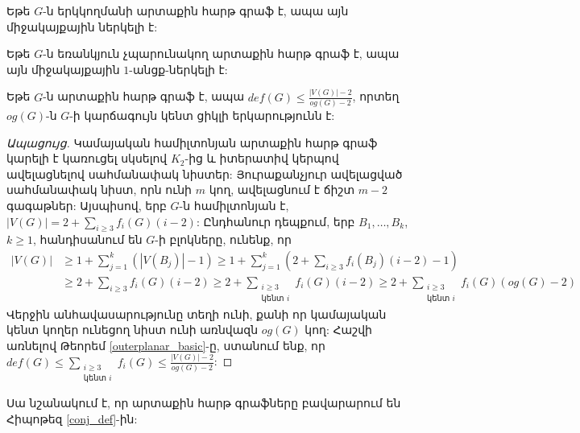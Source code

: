 \begin{hide}
\begin{corollary}
Եթե $G$-ն երկկողմանի արտաքին հարթ գրաֆ է, ապա այն միջակայքային ներկելի է:
\end{corollary}

\begin{corollary}
Եթե $G$-ն եռանկյուն չպարունակող արտաքին հարթ գրաֆ է, ապա այն միջակայքային $1$-անցք-ներկելի է:
\end{corollary}
\end{hide}

\begin{corollary}
Եթե $G$-ն արտաքին հարթ գրաֆ է, ապա 
$def(G) \leq \frac{|V(G)|-2}{og(G)-2}$,
որտեղ $og(G)$-ն $G$-ի կարճագույն կենտ ցիկլի երկարությունն է:
\end{corollary}
\begin{proof}[Ապացույց]
Կամայական համիլտոնյան արտաքին հարթ գրաֆ կարելի է կառուցել սկսելով $K_2$-ից և իտերատիվ կերպով ավելացնելով սահմանափակ նիստեր: Յուրաքանչյուր ավելացված սահմանափակ նիստ, որն ունի $m$ կող, ավելացնում է ճիշտ $m-2$ գագաթներ: Այսպիսով, երբ $G$-ն համիլտոնյան է, $|V(G)| = 2 + \sum\limits_{i\geq 3}f_i(G)(i-2)$: Ընդհանուր դեպքում, երբ $B_1, \ldots, B_k$, $k \geq 1$, հանդիսանում են $G$-ի բլոկները, ունենք, որ 
\begin{align*}
|V(G)| &\geq 1 + \sum\limits_{j=1}^{k}{\left(|V(B_j)|-1\right)} \geq 1 + \sum\limits_{j=1}^{k}{\left(2 + \sum\limits_{i\geq 3}f_i(B_j)(i-2) - 1\right)} \\
&\geq 2 + \sum\limits_{i\geq 3}f_i(G)(i-2) \geq 2 + \sum\limits_{\substack{i\geq 3\\\text{կենտ }i}}{f_i(G)(i-2)} \geq 2 + \sum\limits_{\substack{i\geq 3\\\text{կենտ }i}}{f_i(G)(og(G)-2)}
\end{align*}
Վերջին անհավասարությունը տեղի ունի, քանի որ կամայական կենտ կողեր ունեցող նիստ ունի առնվազն $og(G)$ կող: Հաշվի առնելով Թեորեմ \ref{outerplanar_basic}-ը, ստանում ենք, որ
$def(G) \leq \sum\limits_{\substack{i\geq 3\\\text{կենտ }i}}{f_i(G)} \leq \frac{|V(G)| - 2}{og(G)-2}$:
\end{proof}

Սա նշանակում է, որ արտաքին հարթ գրաֆները բավարարում են Հիպոթեզ \ref{conj_def}-ին:
